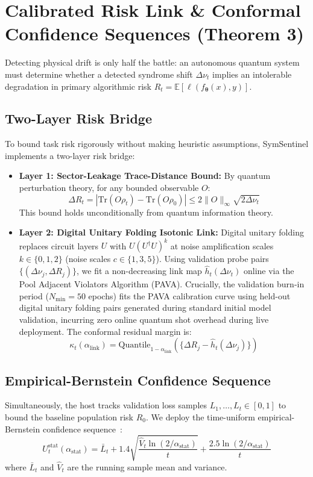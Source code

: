 \documentclass[aps,pra,twocolumn,superscriptaddress,10pt,floatfix]{revtex4-2}
\begin{document}
\section{Calibrated Risk Link \& Conformal Confidence Sequences (Theorem 3)}
\label{sec:certify}
Detecting physical drift is only half the battle: an autonomous quantum system must determine whether a detected syndrome shift $\Delta \nu_t$ implies an intolerable degradation in primary algorithmic risk $R_t = \mathbb{E}[\ell(f_{\bm{\theta}}(x), y)]$.

\subsection{Two-Layer Risk Bridge}
To bound task risk rigorously without making heuristic assumptions, SymSentinel implements a two-layer risk bridge:
\begin{itemize}
    \item \textbf{Layer 1: Sector-Leakage Trace-Distance Bound:} By quantum perturbation theory, for any bounded observable $O$:
    \begin{equation}
    \Delta R_t = |\mathrm{Tr}(O \rho_t) - \mathrm{Tr}(O \rho_0)| \le 2 \|O\|_\infty \sqrt{2 \Delta \nu_t}
    \label{eq:layer1_bound}
    \end{equation}
    This bound holds unconditionally from quantum information theory.
    \item \textbf{Layer 2: Digital Unitary Folding Isotonic Link:} Digital unitary folding replaces circuit layers $U$ with $U (U^\dagger U)^k$ at noise amplification scales $k \in \{0, 1, 2\}$ (noise scales $c \in \{1, 3, 5\}$). Using validation probe pairs $\{(\Delta \nu_j, \Delta R_j)\}$, we fit a non-decreasing link map $\hat{h}_t(\Delta \nu_t)$ online via the Pool Adjacent Violators Algorithm (PAVA). Crucially, the validation burn-in period ($N_{\mathrm{min}} = 50$ epochs) fits the PAVA calibration curve using held-out digital unitary folding pairs generated during standard initial model validation, incurring zero online quantum shot overhead during live deployment. The conformal residual margin is:
    \begin{equation}
    \kappa_t(\alpha_{\mathrm{link}}) = \text{Quantile}_{1 - \alpha_{\mathrm{link}}}\left( \{\Delta R_j - \hat{h}_t(\Delta \nu_j)\} \right)
    \end{equation}
\end{itemize}

\subsection{Empirical-Bernstein Confidence Sequence}
Simultaneously, the host tracks validation loss samples $L_1, \dots, L_t \in [0, 1]$ to bound the baseline population risk $R_0$. We deploy the time-uniform empirical-Bernstein confidence sequence~\cite{howard2021time,waudby2024estimating}:
\begin{equation}
U_t^{\mathrm{stat}}(\alpha_{\mathrm{stat}}) = \bar{L}_t + 1.4 \sqrt{\frac{\hat{V}_t \ln(2/\alpha_{\mathrm{stat}})}{t}} + \frac{2.5 \ln(2/\alpha_{\mathrm{stat}})}{t}
\label{eq:emp_bernstein}
\end{equation}
where $\bar{L}_t$ and $\hat{V}_t$ are the running sample mean and variance.
\end{document}
